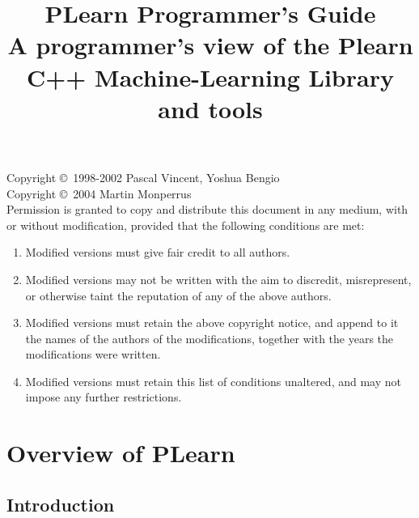 \documentclass[11pt]{book}
\title{\Huge PLearn Programmer's Guide\\ \Large A programmer's view of the Plearn C++ Machine-Learning Library and tools}
\begin{document}
\thispagestyle{empty}

\maketitle

\pagebreak

\vspace*{10cm}



Copyright \copyright\ 1998-2002 Pascal Vincent, Yoshua Bengio \\
Copyright \copyright\ 2004 Martin Monperrus \\

Permission is granted to copy and distribute this document in any medium,
with or without modification, provided that the following conditions are
met:

\begin{enumerate}
\item Modified versions must give fair credit to all authors.
\item Modified versions may not be written with the aim to discredit, misrepresent, or otherwise taint the
      reputation of any of the above authors.
\item Modified versions must retain the above copyright notice, and append to
   it the names of the authors of the modifications, together with the years the
   modifications were written.
\item Modified versions must retain this list of conditions unaltered, 
    and may not impose any further restrictions.
\end{enumerate}


\pagebreak

\tableofcontents

\cleardoublepage\pagebreak
{}


\chapter{ Overview of PLearn}
\section{ Introduction}
\end{document}
